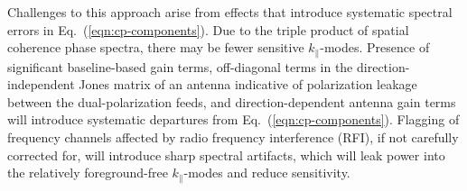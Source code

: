 \documentclass[
reprint,
superscriptaddress,
amsmath,
amssymb,
aps,
prd
]{revtex4-1}
\begin{document}
Challenges to this approach arise from effects that introduce systematic spectral errors in Eq.~(\ref{eqn:cp-components}). Due to the triple product of spatial coherence phase spectra, there may be  fewer sensitive $k_\parallel$-modes. Presence of significant baseline-based gain terms, off-diagonal terms in the direction-independent Jones matrix of an antenna indicative of polarization leakage between the dual-polarization feeds, and direction-dependent antenna gain terms will introduce systematic departures from Eq.~(\ref{eqn:cp-components}). Flagging of frequency channels affected by radio frequency interference (RFI), if not carefully corrected for, will introduce sharp spectral artifacts, which will leak power into the relatively foreground-free $k_\parallel$-modes and reduce sensitivity.


\end{document}
